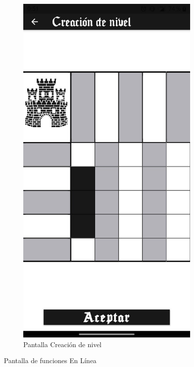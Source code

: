 \begin{figure}[H]
\begin{subfigure}[b]{0.45\linewidth}
    \end{subfigure}
    \begin{subfigure}[b]{0.45\linewidth}
      \includegraphics[width=\linewidth]{images/man9.jpeg}
      \caption{Pantalla Creación de nivel}
      \label{fig:man1-9}
    \end{subfigure}
    \caption{Pantalla de funciones En Línea}
    \label{fig:man5}
  \end{figure}

